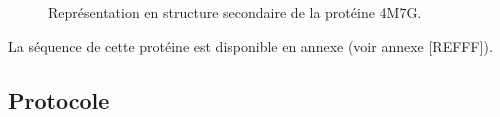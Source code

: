 
\begin{figure}[H]
   \centering
   \caption{Représentation en structure secondaire de la protéine 4M7G. }
   \label{fig:struct_secondaires}
\end{figure}


La séquence de cette protéine est disponible en annexe (voir annexe [REFFF]).


\subsection{Protocole}

